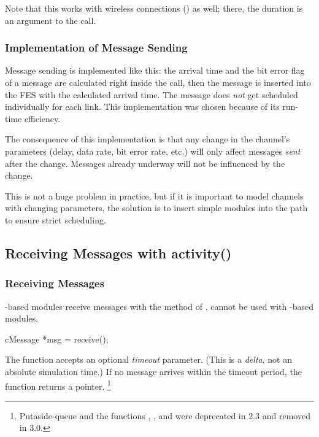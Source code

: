 Note that this works with wireless connections ()
as well; there, the duration is an argument to the 
call.


\subsubsection{Implementation of Message Sending}

Message sending is implemented like this: the arrival time
and the bit error flag of a message are calculated right inside
the  call, then the message is inserted into the FES
with the calculated arrival time. The message does \textit{not} get scheduled
individually for each link. This implementation was chosen because of its
run-time efficiency.

\begin{note}
   The consequence of this implementation is that any change in the
   channel's parameters (delay, data rate, bit error rate, etc.) will only affect
   messages \textit{sent} after the change. Messages already underway will not
   be influenced by the change.

   This is not a huge problem in practice, but if it is important to model
   channels with changing parameters, the solution is to insert simple modules
   into the path to ensure strict scheduling.
\end{note}


\subsection{Receiving Messages with activity()}

\subsubsection{Receiving Messages}
\label{sec:simple-modules:receiving-messages}

-based modules receive messages with the 
method of .  cannot be used with
-based modules.

\begin{cpp}
cMessage *msg = receive();
\end{cpp}

The  function accepts an optional \textit{timeout}
parameter. (This is a \textit{delta}, not an
absolute simulation time.) If no message arrives within the timeout
period, the function returns a  pointer.
    \footnote{Putaside-queue and the functions ,
    , and  were deprecated
    in {\opp} 2.3 and removed in {\opp} 3.0.}

